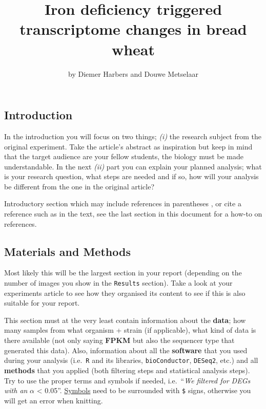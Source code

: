 \title{Iron deficiency triggered transcriptome changes in bread wheat}
\author{by Diemer Harbers and Douwe Metselaar}

\maketitle


\hypertarget{introduction}{%
\subsection{Introduction}\label{introduction}}

In the introduction you will focus on two things; \emph{(i)} the
research subject from the original experiment. Take the article's
abstract as inspiration but keep in mind that the target audience are
your fellow students, the biology must be made understandable. In the
next \emph{(ii)} part you can explain your planned analysis; what is
your research question, what steps are needed and if so, how will your
analysis be different from the one in the original article?

Introductory section which may include references in parentheses
\citep{R}, or cite a reference such as \citet{R} in the text, see the
last section in this document for a how-to on references.

\hypertarget{materials-and-methods}{%
\subsection{Materials and Methods}\label{materials-and-methods}}

Most likely this will be the largest section in your report (depending
on the number of images you show in the \texttt{Results} section). Take
a look at your experiments article to see how they organised its content
to see if this is also suitable for your report.

This section must at the very least contain information about the
\textbf{data}; how many samples from what organism + strain (if
applicable), what kind of data is there available (not only saying
\textbf{FPKM} but also the sequencer type that generated this data).
Also, information about all the \textbf{software} that you used during
your analysis (i.e.~\texttt{R} and its libraries, \texttt{bioConductor},
\texttt{DESeq2}, etc.) and all \textbf{methods} that you applied (both
filtering steps and statistical analysis steps). Try to use the proper
terms and symbols if needed, i.e.~``\emph{We filtered for DEGs with an}
\(\alpha\) \textless{} 0.05''.
\href{https://www.artofproblemsolving.com/wiki/index.php/LaTeX:Symbols}{Symbols}
need to be surrounded with \texttt{\$} signs, otherwise you will get an
error when knitting.

